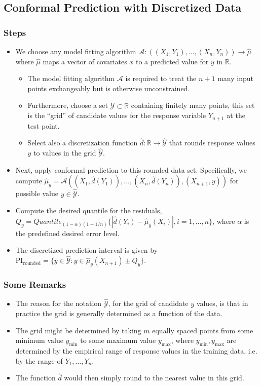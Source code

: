 \documentclass[11pt,a4paper]{article}
\begin{document}
\subsection{Conformal Prediction with Discretized Data}
\subsubsection{Steps}
\begin{itemize}
    \item We choose any model fitting algorithm $\mathcal{A} : ((X_1, Y_1), \dots, (X_n, Y_n)) \rightarrow \hat{\mu}$ where $\hat{\mu}$ maps a vector of covariates $x$ to a predicted value for $y$ in $\mathbb{R}$.
    \begin{itemize}
        \item The model fitting algorithm $\mathcal{A}$ is required to treat the $n+1$ many input points exchangeably but is otherwise unconstrained.
        \item Furthermore, choose a set $\hat{\mathcal{Y}} \subset \mathbb{R}$ containing finitely many points, this set is the ``grid'' of candidate values for the response variable $Y_{n+1}$ at the test point.
        \item Select also a discretization function $\hat{d} : \mathbb{R} \rightarrow \hat{\mathcal{Y}}$ that rounds response values $y$ to values in the grid $\hat{\mathcal{Y}}$.
    \end{itemize}
    \item Next, apply conformal prediction to this rounded data set. Specifically, we compute $\hat{\mu}_y = \mathcal{A}((X_1, \hat{d}(Y_1)), \dots, (X_n, \hat{d}(Y_n)), (X_{n+1}, y))$ for possible value $y \in \hat{\mathcal{Y}}$.
    \item Compute the desired quantile for the residuals, $Q_y = Quantile_{(1-\alpha)(1+1/n)}\{|\hat{d}(Y_i) - \hat{\mu}_y(X_i)|, i = 1, \dots, n\}$, where $\alpha$ is the predefined desired error level.
    \item The discretized prediction interval is given by $\text{PI}_{\text{rounded}} = \{y \in \hat{\mathcal{Y}} : y \in \hat{\mu}_y(X_{n+1}) \pm Q_y\}$.
\end{itemize}

\subsubsection{Some Remarks}
\begin{itemize}
    \item The reason for the notation $\hat{\mathcal{Y}}$, for the grid of candidate $y$ values, is that in practice the grid is generally determined as a function of the data.
    \item The grid might be determined by taking $m$ equally spaced points from some minimum value $y_{\text{min}}$ to some maximum value $y_{\text{max}}$, where $y_{\text{min}}, y_{\text{max}}$ are determined by the empirical range of response values in the training data, i.e. by the range of $Y_1, \dots, Y_n$.
    \item The function $\hat{d}$ would then simply round to the nearest value in this grid.
\end{itemize}
\end{document}
